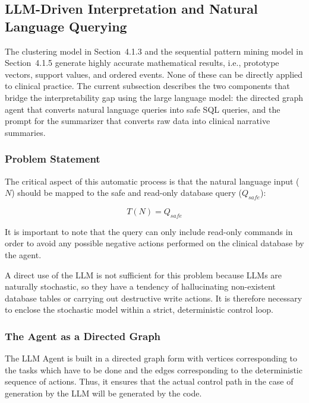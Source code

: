 \subsection{LLM-Driven Interpretation and Natural Language Querying}

The clustering model in Section~4.1.3 and the sequential pattern mining model in Section~4.1.5 generate highly accurate mathematical results, i.e., prototype vectors, support values, and ordered events. None of these can be directly applied to clinical practice. The current subsection describes the two components that bridge the interpretability gap using the large language model: the directed graph agent that converts natural language queries into safe SQL queries, and the prompt for the summarizer that converts raw data into clinical narrative summaries.

\subsubsection*{Problem Statement}

The critical aspect of this automatic process is that the natural language input ($N$) should be mapped to the safe and read-only database query ($Q_{safe}$):

\begin{equation}
    T(N) = Q_{safe}
    \label{eq:translation}
\end{equation}

It is important to note that the query can only include read-only commands in order to avoid any possible negative actions performed on the clinical database by the agent.

A direct use of the LLM is not sufficient for this problem because LLMs are naturally stochastic, so they have a tendency of hallucinating non-existent database tables or carrying out destructive write actions. It is therefore necessary to enclose the stochastic model within a strict, deterministic control loop.

\subsubsection*{The Agent as a Directed Graph}

The LLM Agent is built in a directed graph form with vertices corresponding to the tasks which have to be done and the edges corresponding to the deterministic sequence of actions. Thus, it ensures that the actual control path in the case of generation by the LLM will be generated by the code.

